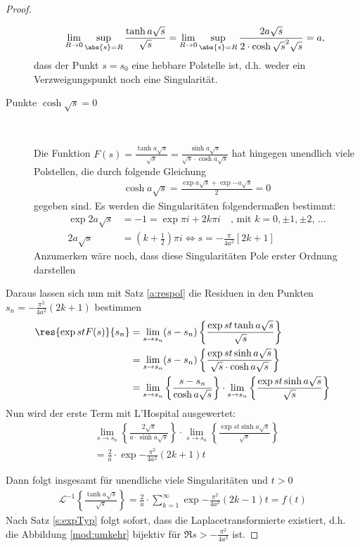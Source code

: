 \begin{satz}
\begin{proof}
\begin{description}
	\begin{align}
	\lim_{R \rightarrow 0} \sup_{\abs{s} = R} \frac{\tanh{a \sqrt{s}}}{\sqrt{s}} = \lim_{R \rightarrow 0} \sup_{\abs{s} = R} \frac{2 a \sqrt{s}}{2 \cdot \cosh{\sqrt{s}}^2 \sqrt{s}}	 = a \text{, }
	\end{align}
	dass der Punkt $s = s_0$ eine hebbare Polstelle ist, d.h. weder ein Verzweigungspunkt noch eine Singularität.
\item[Punkte $\cosh{\sqrt{s}} = 0$] ~\par
Die Funktion $F(s) = \frac{\tanh{a \sqrt{s}}}{\sqrt{s}} = \frac{\sinh{a \sqrt{s}}}{\sqrt{s} \cdot \cosh{a \sqrt{s}}}$ hat hingegen unendlich viele Polstellen, die durch folgende Gleichung
\begin{align}
	\cosh{a \sqrt{s}} = \frac{\exp{a \sqrt{s}} + \exp{-a \sqrt{s}}}{2} = 0
\end{align}
gegeben sind.
Es werden die Singularitäten folgendermaßen bestimmt:
\begin{align}
	\exp{2 a \sqrt{s}} &= -1 = \exp{\pi i + 2 k \pi i} \quad \text{, mit } k=0, \pm 1, \pm 2\text{, ...} \\
	2 a \sqrt{s} &= (k + \frac{1}{2}) \pi i \Leftrightarrow s = - \frac{\pi}{4 a^2} \left[2 k + 1 \right]
\end{align}
Anzumerken wäre noch, dass diese Singularitäten Pole erster Ordnung darstellen
\end{description}
Daraus lassen sich nun mit Satz \ref{a:respol} die  
Residuen in den Punkten $s_n = -\frac{\pi^2}{4 a^2} \left( 2 k + 1 \right)$ bestimmen
		\begin{align}
			\res{\exp{st}F(s)}{s_n} &=  \lim_{s \rightarrow s_n} (s - s_n) \left\{ \frac{\exp{st} \tanh{a \sqrt{s}} }{\sqrt{s}}  \right\}\\
			&=\lim_{s \rightarrow s_n} (s - s_n) \left\{ \frac{\exp{st} \sinh{a \sqrt{s}} }{\sqrt{s} \cdot \cosh{a \sqrt{s}}}  \right\}\\
			&=\lim_{s \rightarrow s_n} \left\{\frac{s - s_n}{\cosh{a \sqrt{s}}}\right\} \cdot  \lim_{s \rightarrow s_n} \left\{ \frac{\exp{st} \sinh{a \sqrt{s}}}{ \sqrt{s}}\right\}
		\end{align}
		Nun wird der erste Term mit L'Hospital ausgewertet:
		\begin{align}
			&\lim_{s \rightarrow s_n} \left\{ \frac{2 \sqrt{s}}{a  \cdot \sinh{a \sqrt{s}}} \right\} \cdot  \lim_{s \rightarrow s_n} \left\{ \frac{\exp{st} \sinh{a \sqrt{s}}}{ \sqrt{s}}\right\}\\
			&= \frac{2}{a} \cdot \exp{-\frac{\pi^2}{4 a^2} \left( 2 k + 1 \right) t}
		\end{align}
		
Dann folgt insgesamt für unendliche viele Singularitäten und $t > 0$
\begin{align}
	\mathscr{L}^{-1} \left\{\frac{\tanh{a \sqrt{s}}}{\sqrt{s}} \right\} = \frac{2}{a} \cdot \sum_{k=1}^{\infty}  \exp{-\frac{\pi^2}{4 a^2} \left( 2 k - 1 \right) t} =f(t)
\end{align}
Nach Satz \ref{s:expTyp} folgt sofort, dass die Laplacetransformierte existiert, d.h. die Abbildung 
\ref{mod:umkehr} bijektiv für $\Re{s} > -\frac{\pi^2}{4 a^2}$ ist.
\end{proof}
\end{satz}
